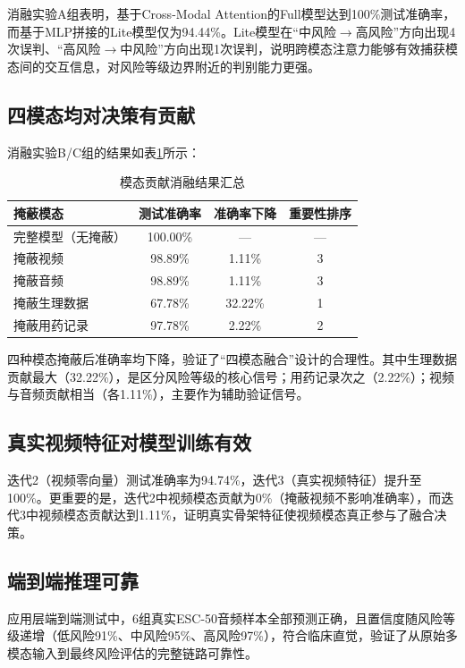 消融实验A组表明，基于Cross-Modal Attention的Full模型达到100\%测试准确率，而基于MLP拼接的Lite模型仅为94.44\%。Lite模型在``中风险$\to$高风险''方向出现4次误判、``高风险$\to$中风险''方向出现1次误判，说明跨模态注意力能够有效捕获模态间的交互信息，对风险等级边界附近的判别能力更强。

\subsection{四模态均对决策有贡献}

消融实验B/C组的结果如表\ref{tab:conclusion-ablation}所示：

\begin{table}[H]
    \centering
    \caption{模态贡献消融结果汇总}
    \label{tab:conclusion-ablation}
    \begin{tabular}{lccc}
        \toprule
        掩蔽模态 & 测试准确率 & 准确率下降 & 重要性排序 \\
        \midrule
        完整模型（无掩蔽） & 100.00\% & --- & --- \\
        掩蔽视频 & 98.89\% & 1.11\% & 3 \\
        掩蔽音频 & 98.89\% & 1.11\% & 3 \\
        掩蔽生理数据 & 67.78\% & 32.22\% & 1 \\
        掩蔽用药记录 & 97.78\% & 2.22\% & 2 \\
        \bottomrule
    \end{tabular}
\end{table}

四种模态掩蔽后准确率均下降，验证了``四模态融合''设计的合理性。其中生理数据贡献最大（32.22\%），是区分风险等级的核心信号；用药记录次之（2.22\%）；视频与音频贡献相当（各1.11\%），主要作为辅助验证信号。

\subsection{真实视频特征对模型训练有效}

迭代2（视频零向量）测试准确率为94.74\%，迭代3（真实视频特征）提升至100\%。更重要的是，迭代2中视频模态贡献为0\%（掩蔽视频不影响准确率），而迭代3中视频模态贡献达到1.11\%，证明真实骨架特征使视频模态真正参与了融合决策。

\subsection{端到端推理可靠}

应用层端到端测试中，6组真实ESC-50音频样本全部预测正确，且置信度随风险等级递增（低风险91\%、中风险95\%、高风险97\%），符合临床直觉，验证了从原始多模态输入到最终风险评估的完整链路可靠性。

